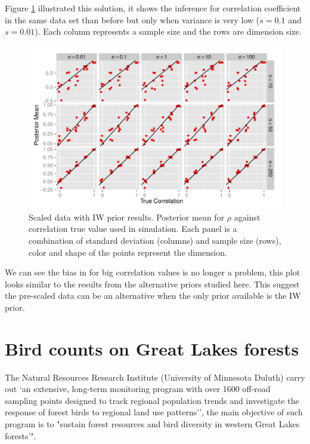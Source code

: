 \documentclass{article}
\begin{document}
Figure \ref{sciw} illustrated this solution, it shows the inference for correlation coefficient in the same data set than before but only when variance is very low ($s=0.1$ and $s=0.01$). Each column represents a sample size and the rows are dimension size. 

\begin{figure}[htbp]
   \centering
   \includegraphics[width=\textwidth]{scIW} %
    \vspace{-.5in}
   \caption{Scaled data with IW prior results. Posterior mean for $\rho$  against correlation true value used in simulation. Each panel is a combination of standard deviation (columns) and sample size (rows),  color and shape of the points represent the dimension. \label{sciw} }
\end{figure}

We can see the bias in for big correlation values is no longer a problem, this plot looks similar to the results from the alternative priors studied here. This suggest the pre-scaled data can be an alternative when the only prior available is the IW prior. 


\section{Bird counts on Great Lakes forests}

The Natural Resources Research Institute (University of Minnesota Duluth) carry out `an extensive, long-term monitoring program with over 1600 off-road sampling points designed to track regional population trends and investigate the response of forest birds to regional land use patterns'', the main objective of such program is to  "sustain forest resources and bird diversity in western Great Lakes forests'".
\end{document}
